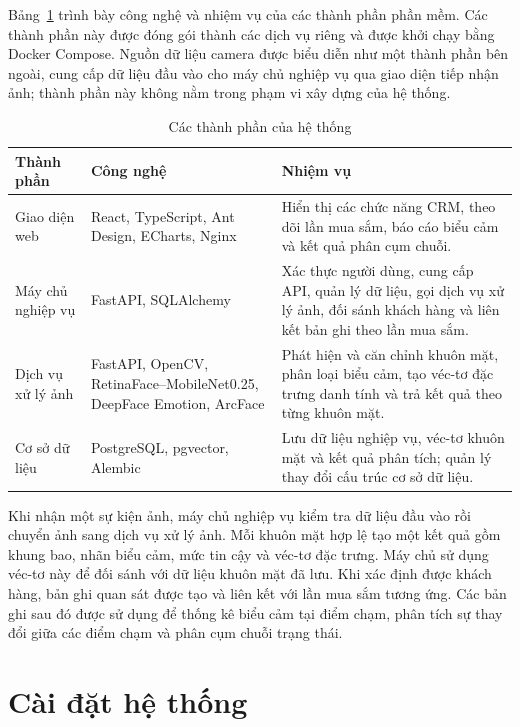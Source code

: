 \documentclass[../LuanVan.tex]{subfiles}
\begin{document}
Bảng~\ref{tab:system_components} trình bày công nghệ và nhiệm vụ của các thành phần phần mềm. Các thành phần này được đóng gói thành các dịch vụ riêng và được khởi chạy bằng Docker Compose. Nguồn dữ liệu camera được biểu diễn như một thành phần bên ngoài, cung cấp dữ liệu đầu vào cho máy chủ nghiệp vụ qua giao diện tiếp nhận ảnh; thành phần này không nằm trong phạm vi xây dựng của hệ thống.

\begin{table}[H]
    \centering
    \caption{Các thành phần của hệ thống}
    \label{tab:system_components}
    \begin{tabular}{|>{\raggedright\arraybackslash}p{3.0cm}|>{\raggedright\arraybackslash}p{3.8cm}|>{\raggedright\arraybackslash}p{6.8cm}|}
        \hline
        \textbf{Thành phần} & \textbf{Công nghệ} & \textbf{Nhiệm vụ} \\
        \hline
        Giao diện web & React, TypeScript, Ant Design, ECharts, Nginx & Hiển thị các chức năng CRM, theo dõi lần mua sắm, báo cáo biểu cảm và kết quả phân cụm chuỗi. \\
        \hline
        Máy chủ nghiệp vụ & FastAPI, SQLAlchemy & Xác thực người dùng, cung cấp API, quản lý dữ liệu, gọi dịch vụ xử lý ảnh, đối sánh khách hàng và liên kết bản ghi theo lần mua sắm. \\
        \hline
        Dịch vụ xử lý ảnh & FastAPI, OpenCV, RetinaFace--MobileNet0.25, DeepFace Emotion, ArcFace & Phát hiện và căn chỉnh khuôn mặt, phân loại biểu cảm, tạo véc-tơ đặc trưng danh tính và trả kết quả theo từng khuôn mặt. \\
        \hline
        Cơ sở dữ liệu & PostgreSQL, pgvector, Alembic & Lưu dữ liệu nghiệp vụ, véc-tơ khuôn mặt và kết quả phân tích; quản lý thay đổi cấu trúc cơ sở dữ liệu. \\
        \hline
    \end{tabular}
\end{table}

Khi nhận một sự kiện ảnh, máy chủ nghiệp vụ kiểm tra dữ liệu đầu vào rồi chuyển ảnh sang dịch vụ xử lý ảnh. Mỗi khuôn mặt hợp lệ tạo một kết quả gồm khung bao, nhãn biểu cảm, mức tin cậy và véc-tơ đặc trưng. Máy chủ sử dụng véc-tơ này để đối sánh với dữ liệu khuôn mặt đã lưu. Khi xác định được khách hàng, bản ghi quan sát được tạo và liên kết với lần mua sắm tương ứng. Các bản ghi sau đó được sử dụng để thống kê biểu cảm tại điểm chạm, phân tích sự thay đổi giữa các điểm chạm và phân cụm chuỗi trạng thái.

\section{Cài đặt hệ thống}
\label{section:4.2}
\end{document}
